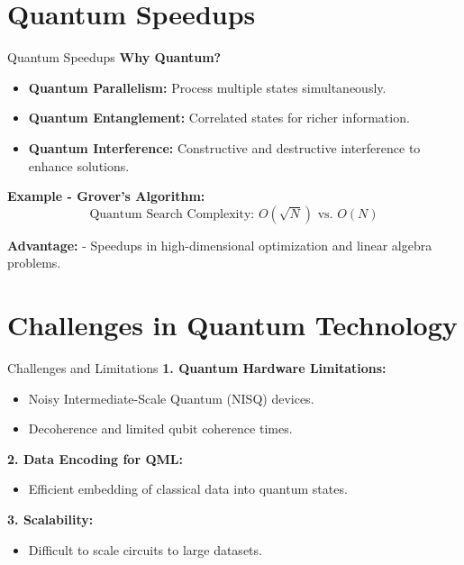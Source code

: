 \documentclass{beamer}
\begin{document}
\section{Quantum Speedups}
\begin{frame}{Quantum Speedups}
\textbf{Why Quantum?}
\begin{itemize}
    \item \textbf{Quantum Parallelism:} Process multiple states simultaneously.
    \item \textbf{Quantum Entanglement:} Correlated states for richer information.
    \item \textbf{Quantum Interference:} Constructive and destructive interference to enhance solutions.
\end{itemize}

\textbf{Example - Grover's Algorithm:}
\[
\text{Quantum Search Complexity: } O(\sqrt{N}) \text{ vs. } O(N)
\]

\textbf{Advantage:}
- Speedups in high-dimensional optimization and linear algebra problems.
\end{frame}

\section{Challenges in Quantum Technology}
\begin{frame}{Challenges and Limitations}
\textbf{1. Quantum Hardware Limitations:}
\begin{itemize}
    \item Noisy Intermediate-Scale Quantum (NISQ) devices.
    \item Decoherence and limited qubit coherence times.
\end{itemize}

\textbf{2. Data Encoding for QML:}
\begin{itemize}
    \item Efficient embedding of classical data into quantum states.
\end{itemize}

\textbf{3. Scalability:}
\begin{itemize}
    \item Difficult to scale circuits to large datasets.
\end{itemize}
\end{frame}
\end{document}
